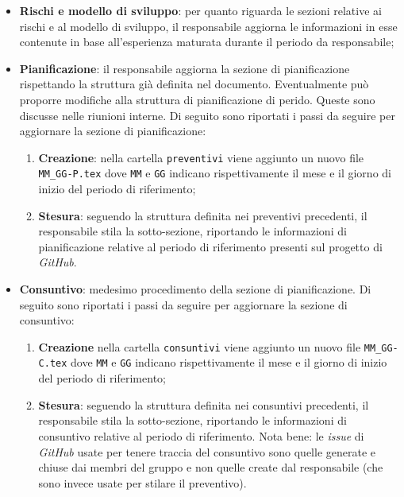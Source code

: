 \begin{itemize}
	\item \textbf{Rischi e modello di sviluppo}: per quanto riguarda le sezioni
	      relative ai rischi e al modello di sviluppo, il responsabile aggiorna
	      le informazioni in esse contenute in base all'esperienza maturata
	      durante il periodo da responsabile;

	\item \textbf{Pianificazione}: il responsabile aggiorna la sezione di
	      pianificazione rispettando la struttura già definita nel documento.
	      Eventualmente può proporre modifiche alla struttura di pianificazione
	      di perido. Queste sono discusse nelle riunioni interne.
	      Di seguito sono riportati i passi da seguire per aggiornare la sezione
	      di pianificazione:
	      \begin{enumerate}
		      \item \textbf{Creazione}: nella cartella \texttt{preventivi} viene
		            aggiunto un nuovo file \texttt{MM\_GG-P.tex} dove
		            \texttt{MM} e \texttt{GG} indicano rispettivamente il mese e
		            il giorno di inizio del periodo di riferimento;

		      \item \textbf{Stesura}: seguendo la struttura definita nei
		            preventivi precedenti, il responsabile stila la
		            sotto-sezione, riportando le informazioni di pianificazione
		            relative al periodo di riferimento presenti sul progetto di
		            \textit{GitHub}.
	      \end{enumerate}

	\item \textbf{Consuntivo}: medesimo procedimento della sezione di
	      pianificazione. Di seguito sono riportati i passi da seguire per
	      aggiornare la sezione di consuntivo:
	      \begin{enumerate}
		      \item \textbf{Creazione} nella cartella \texttt{consuntivi} viene
		            aggiunto un nuovo file \texttt{MM\_GG-C.tex} dove
		            \texttt{MM} e \texttt{GG} indicano rispettivamente il mese e
		            il giorno di inizio del periodo di riferimento;

		      \item \textbf{Stesura}: seguendo la struttura definita nei
		            consuntivi precedenti, il responsabile stila la
		            sotto-sezione, riportando le informazioni di consuntivo
		            relative al periodo di riferimento. Nota bene: le
		            \textit{issue} di \textit{GitHub} usate per tenere traccia
		            del consuntivo sono quelle generate e chiuse dai membri del
		            gruppo e non quelle create dal responsabile (che
		            sono invece usate per stilare il preventivo).
	      \end{enumerate}


\end{itemize}
